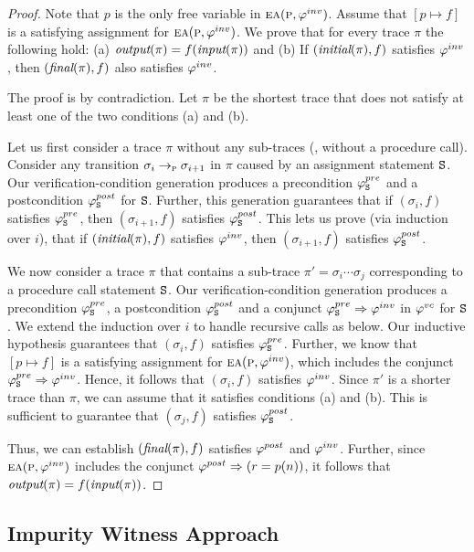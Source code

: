\begin{proof}
Note that $p$ is the only free variable in $\textsc{ea}(\textsc{p},\varphi^{inv})$. Assume that $[p \mapsto f]$ is a
satisfying assignment for $\textsc{ea}(\textsc{p},\varphi^{inv})$.
We prove that for every trace $\pi$ the following hold:
(a) $\textit{output}(\pi) = f(\textit{input}(\pi))$ and
(b) If $(\textit{initial}(\pi),f)$ satisfies $\varphi^{inv}$, then $(\textit{final}(\pi),f)$ also satisfies $\varphi^{inv}$.

The proof is by contradiction. Let $\pi$ be the shortest trace that does not satisfy at least
one of the two conditions (a) and (b).

Let us first consider a trace $\pi$ without any sub-traces (\ie, without a procedure call).
Consider any transition $\sigma_i \rightarrow_{\textsc{p}} \sigma_{i+1}$ in $\pi$
caused by an assignment statement $\texttt{S}$. Our verification-condition generation produces
a precondition $\varphi^{pre}_{\texttt{S}}$ and a postcondition $\varphi^{post}_{\texttt{S}}$ for $\texttt{S}$. Further, this generation
guarantees that if $(\sigma_i,f)$ satisfies $\varphi^{pre}_{\texttt{S}}$, then $(\sigma_{i+1},f)$ satisfies $\varphi^{post}_{\texttt{S}}$.
This lets us prove (via induction over $i$), that if $(\textit{initial}(\pi),f)$ satisfies $\varphi^{inv}$,
then $(\sigma_{i+1},f)$ satisfies $\varphi^{post}_{\texttt{S}}$.

We now consider a trace $\pi$ that contains a sub-trace $\pi' = \sigma_i \cdots \sigma_j$ corresponding to a procedure call
statement $\texttt{S}$. Our verification-condition generation produces a precondition $\varphi^{pre}_{\texttt{S}}$,
a postcondition $\varphi^{post}_{\texttt{S}}$  and a conjunct $\varphi^{pre}_{\texttt{S}} \Rightarrow \varphi^{inv}$ in $\varphi^{vc}$ for $\texttt{S}$.
We extend the induction over $i$ to handle recursive calls as below.
Our inductive hypothesis guarantees that $(\sigma_i,f)$ satisfies $\varphi^{pre}_{\texttt{S}}$.
Further, we know that $[p \mapsto f]$ is a satisfying assignment for $\textsc{ea}(\textsc{p},\varphi^{inv})$,
which includes the conjunct $\varphi^{pre}_{\texttt{S}} \Rightarrow \varphi^{inv}$. Hence, it follows that  $(\sigma_i,f)$ satisfies $\varphi^{inv}$.
Since $\pi'$ is a shorter trace than $\pi$, we can assume that it satisfies conditions (a)
and (b). This is sufficient to guarantee that $(\sigma_j,f)$ satisfies $\varphi^{post}_{\texttt{S}}$.

Thus, we can establish $(\textit{final}(\pi),f)$ satisfies $\varphi^{post}$ and $\varphi^{inv}$. Further, since 
$\textsc{ea}(\textsc{p},\varphi^{inv})$ includes the conjunct $\varphi^{post} \Rightarrow (r = p(n))$, it follows that
$\textit{output}(\pi) = f(\textit{input}(\pi))$.
\end{proof}

\subsection{Impurity Witness Approach}

